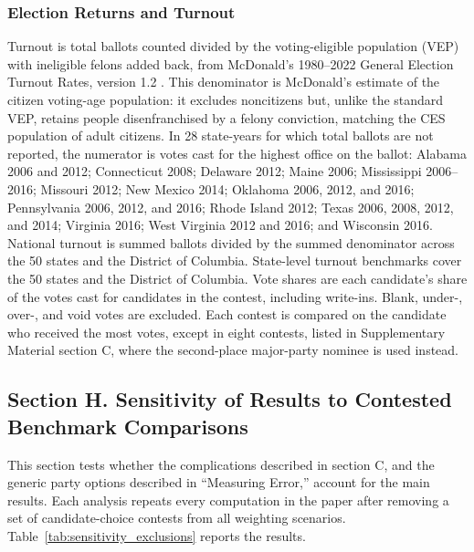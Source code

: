\documentclass[12pt]{article}
\begin{document}
\subsubsection*{Election Returns and Turnout}
Turnout is total ballots counted divided by the voting-eligible population (VEP) with ineligible felons added back, from McDonald's 1980--2022 General Election Turnout Rates, version 1.2 \parencite{mcdonald_voter_nodate}. This denominator is McDonald's estimate of the citizen voting-age population: it excludes noncitizens but, unlike the standard VEP, retains people disenfranchised by a felony conviction, matching the CES population of adult citizens. In 28 state-years for which total ballots are not reported, the numerator is votes cast for the highest office on the ballot: Alabama 2006 and 2012; Connecticut 2008; Delaware 2012; Maine 2006; Mississippi 2006--2016; Missouri 2012; New Mexico 2014; Oklahoma 2006, 2012, and 2016; Pennsylvania 2006, 2012, and 2016; Rhode Island 2012; Texas 2006, 2008, 2012, and 2014; Virginia 2016; West Virginia 2012 and 2016; and Wisconsin 2016. National turnout is summed ballots divided by the summed denominator across the 50 states and the District of Columbia. State-level turnout benchmarks cover the 50 states and the District of Columbia. Vote shares are each candidate's share of the votes cast for candidates in the contest, including write-ins. Blank, under-, over-, and void votes are excluded. Each contest is compared on the candidate who received the most votes, except in eight contests, listed in Supplementary Material section C, where the second-place major-party nominee is used instead.



\clearpage
\subsection*{Section H. Sensitivity of Results to Contested Benchmark Comparisons}
{}
\label{app:sensitivity_exclusions}

This section tests whether the complications described in section C, and the generic party options described in ``Measuring Error,'' account for the main results. Each analysis repeats every computation in the paper after removing a set of candidate-choice contests from all weighting scenarios. Table~\ref{tab:sensitivity_exclusions} reports the results.
\end{document}
